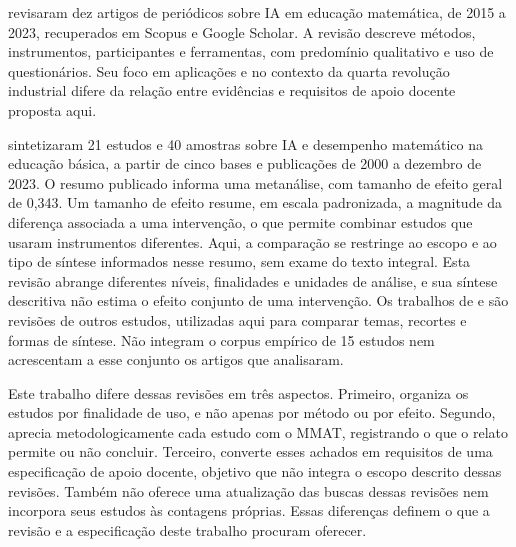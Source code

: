  revisaram dez artigos de periódicos sobre IA em educação matemática, de 2015 a 2023, recuperados em Scopus e Google Scholar. A revisão descreve métodos, instrumentos, participantes e ferramentas, com predomínio qualitativo e uso de questionários. Seu foco em aplicações e no contexto da quarta revolução industrial difere da relação entre evidências e requisitos de apoio docente proposta aqui.

 sintetizaram 21 estudos e 40 amostras sobre IA e desempenho matemático na educação básica, a partir de cinco bases e publicações de 2000 a dezembro de 2023. O resumo publicado informa uma metanálise, com tamanho de efeito geral de 0,343. Um tamanho de efeito resume, em escala padronizada, a magnitude da diferença associada a uma intervenção, o que permite combinar estudos que usaram instrumentos diferentes. Aqui, a comparação se restringe ao escopo e ao tipo de síntese informados nesse resumo, sem exame do texto integral. Esta revisão abrange diferentes níveis, finalidades e unidades de análise, e sua síntese descritiva não estima o efeito conjunto de uma intervenção. Os trabalhos de  e  são revisões de outros estudos, utilizadas aqui para comparar temas, recortes e formas de síntese. Não integram o corpus empírico de 15 estudos nem acrescentam a esse conjunto os artigos que analisaram.

Este trabalho difere dessas revisões em três aspectos. Primeiro, organiza os estudos por finalidade de uso, e não apenas por método ou por efeito. Segundo, aprecia metodologicamente cada estudo com o MMAT, registrando o que o relato permite ou não concluir. Terceiro, converte esses achados em requisitos de uma especificação de apoio docente, objetivo que não integra o escopo descrito dessas revisões. Também não oferece uma atualização das buscas dessas revisões nem incorpora seus estudos às contagens próprias. Essas diferenças definem o que a revisão e a especificação deste trabalho procuram oferecer.


